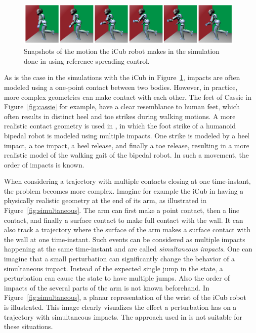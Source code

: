 \documentclass[../DC2019003Bouma.tex]{subfiles}
\begin{document}
\begin{figure}[bt!]
\centering
\includegraphics[width=\textwidth]{rijnen2017.PNG}\caption{Snapshots of the motion the iCub robot makes in the simulation done in \cite{Rijnen2017a} using reference spreading control.}\label{fig:rijnen2017}
\end{figure}

As is the case in the simulations with the iCub in Figure~\ref{fig:rijnen2017}, impacts are often modeled using a one-point contact between two bodies. However, in practice, more complex geometries can make contact with each other. The feet of Cassie in Figure~\ref{fig:cassie} for example, have a clear resemblance to human feet, which often results in distinct heel and toe strikes during walking motions. A more realistic contact geometry is used in \cite{Zhao2015}, in which the foot strike of a humanoid bipedal robot is modeled using multiple impacts. One strike is modeled by a heel impact, a toe impact, a heel release, and finally a toe release, resulting in a more realistic model of the walking gait of the bipedal robot. In such a movement, the order of impacts is known.

When considering a trajectory with multiple contacts closing at one time-instant, the problem becomes more complex. Imagine for example the iCub in \cite{Rijnen2017a} having a physically realistic geometry at the end of its arm, as illustrated in Figure~\ref{fig:simultaneous}. The arm can first make a point contact, then a line contact, and finally a surface contact to make full contact with the wall. It can also track a trajectory where the surface of the arm makes a surface contact with the wall at one time-instant. Such events can be considered as multiple impacts happening at the same time-instant and are called \textit{simultaneous impacts}. One can imagine that a small perturbation can significantly change the behavior of a simultaneous impact. Instead of the expected single jump in the state, a perturbation can cause the state to have multiple jumps. Also the order of impacts of the several parts of the arm is not known beforehand. In Figure~\ref{fig:simultaneous}, a planar representation of the wrist of the iCub robot is illustrated. This image clearly visualizes the effect a perturbation has on a trajectory with simultaneous impacts. The approach used in \cite{Zhao2015} is not suitable for these situations.
\end{document}
